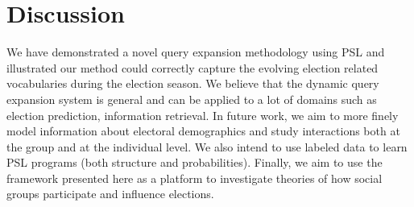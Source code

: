 \section{Discussion}
We have demonstrated a novel query expansion methodology using PSL and illustrated our method could correctly capture the evolving election related vocabularies during the election season.
We believe that the dynamic query expansion system is general and can be applied to a lot of domains such as election prediction, information retrieval.
In future work, we aim to more finely model information about electoral demographics and study
interactions both at the group and at the individual level. We also intend to use labeled data to learn
PSL programs (both structure and probabilities). Finally, we aim to use the framework presented
here as a platform to investigate theories of how social groups participate and influence elections.

